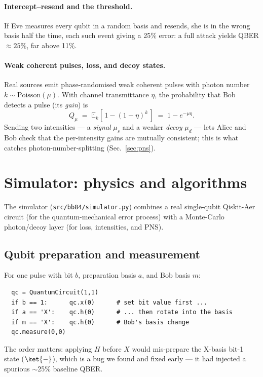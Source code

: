 \documentclass[11pt]{article}
\begin{document}
\paragraph{Intercept--resend and the threshold.} If Eve measures every qubit in a
random basis and resends, she is in the wrong basis half the time, each such event
giving a 25\% error: a full attack yields QBER $\approx 25\%$, far above 11\%.

\paragraph{Weak coherent pulses, loss, and decoy states.} Real sources emit
phase-randomised weak coherent pulses with photon number $k\sim\mathrm{Poisson}(\mu)$.
With channel transmittance $\eta$, the probability that Bob detects a pulse (its
\emph{gain}) is
\begin{equation}
  Q_\mu \;=\; \mathbb{E}_k\!\left[\,1-(1-\eta)^k\,\right] \;=\; 1 - e^{-\mu\eta}.
  \label{eq:gain}
\end{equation}
Sending two intensities --- a \emph{signal} $\mu_s$ and a weaker \emph{decoy}
$\mu_d$ --- lets Alice and Bob check that the per-intensity gains are mutually
consistent; this is what catches photon-number-splitting (Sec.~\ref{sec:pns}).

\section{Simulator: physics and algorithms}
The simulator (\texttt{src/bb84/simulator.py}) combines a real single-qubit
Qiskit-Aer circuit (for the quantum-mechanical error process) with a Monte-Carlo
photon/decoy layer (for loss, intensities, and PNS).

\subsection{Qubit preparation and measurement}
For one pulse with bit $b$, preparation basis $a$, and Bob basis $m$:
\begin{verbatim}
  qc = QuantumCircuit(1,1)
  if b == 1:      qc.x(0)      # set bit value first ...
  if a == 'X':    qc.h(0)      # ... then rotate into the basis
  if m == 'X':    qc.h(0)      # Bob's basis change
  qc.measure(0,0)
\end{verbatim}
The order matters: applying $H$ before $X$ would mis-prepare the X-basis bit-1
state ($\ket{-}$), which is a bug we found and fixed early --- it had injected a
spurious $\sim$25\% baseline QBER.
\end{document}
